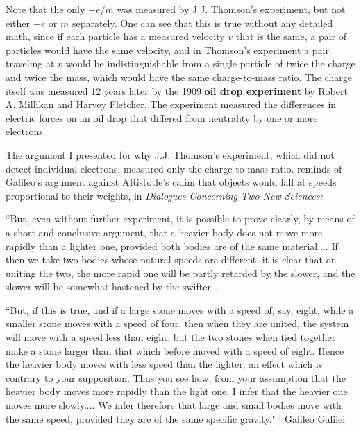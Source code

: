Note that the only $-e/m$ was measured by J.J. Thomson's experiment, but not either $-e$ or $m$ separately. One can see that this is true without any detailed math, since if each particle has a measured velocity $v$ that is the same, a pair of particles would have the same velocity, and in Thomson's experiment a pair traveling at $v$ would be indistinguishable from a single particle of twice the charge and twice the mass, which would have the same charge-to-mass ratio. The charge itself was measured 12 years later by the 1909 \textbf{oil drop experiment} by Robert A. Millikan and Harvey Fletcher. The experiment measured the differences in electric forces on an oil drop that differed from neutrality by one or more electrons.

The argument I presented for why J.J. Thomson's experiment, which did not detect individual electrons, measured only the charge-to-mass ratio. reminds of Galileo's argument against ARistotle's calim that objects would fall at speeds proportional to their weights, in \textit{Dialogues Concerning Two New Sciences:} 

``But, even without further experiment, it is possible to prove clearly, by means of a short and conclusive argument, that a heavier body does not move more rapidly than a lighter one, provided both bodies are of the same material.... If then we take two bodies whose natural speeds are different, it is clear that on uniting the two, the more rapid one will be partly retarded by the slower, and the slower will be somewhat hastened by the swifter...

``But, if this is true, and if a large stone moves with a speed of, say, eight, while a smaller stone moves with a speed of four, then when they are united, the system will move with a speed less than eight; but the two stones when tied together make a stone larger than that which before moved with a speed of eight. Hence the heavier body moves with less speed than the lighter; an effect which is contrary to your supposition. Thus you see how, from your assumption that the heavier body moves more rapidly than the light one, I infer that the heavier one moves more slowly.... We infer therefore that large and small bodies move with the same speed, provided they are of the same specific gravity." | Galileo Galilei

